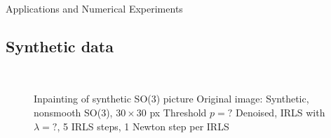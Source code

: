 \begin{chapter}{Applications and Numerical Experiments}
\subsection{Synthetic data} %
\label{sub:Synthetic data}
\begin{figure}[h!]
    \centering
    \\
    \caption[Inpainting of synthetic SO(3) picture]{Inpainting of synthetic SO(3) picture
	 Original image: Synthetic, nonsmooth SO(3), $30\times 30$ px
	 Threshold $p=?$
	 Denoised, IRLS with $\lambda=?$, 5 IRLS steps, 1 Newton step per IRLS
	\label{fig:application_so1}
    }
\end{figure}


\FloatBarrier

\end{chapter}
